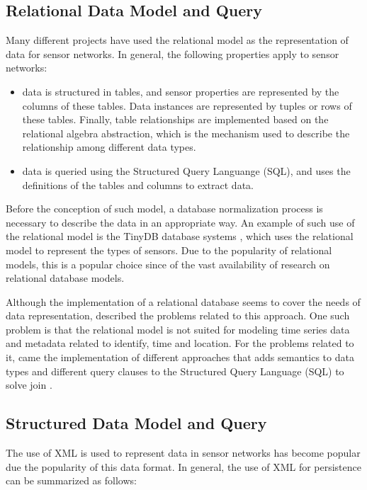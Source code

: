 \subsection{Relational Data Model and Query}

Many different projects have used the relational model \cite{relational-model}
as the representation of data for sensor networks. In general, the following
properties apply to sensor networks:

\begin{itemize}
  \item data is structured in tables, and sensor properties are represented 
 by the columns of these tables. Data instances are represented by tuples or
 rows of these tables. Finally, table relationships are implemented based
 on the relational algebra abstraction, which is the mechanism used to 
describe the relationship among different data types.
  \item data is queried using the Structured Query Languange (SQL), and uses
  the definitions of the tables and columns to extract data.
\end{itemize}

Before the conception of such model, a database normalization process is
necessary to describe the data in an appropriate way. An example of such use
of the relational model is the TinyDB database systems \cite{sn-db-tinydb},
which uses the relational model to represent the types of sensors. Due to the
popularity of relational models, this is a popular choice since of the vast
availability of research on relational database models.

Although the implementation of a relational database seems to cover the needs
of data representation, \cite{sn-data-model-survey} described the problems
related to this approach. One such problem is that the relational model is not
suited for modeling time series data and metadata related to identify, time and
location. For the problems related to it, came the implementation of different
approaches that adds semantics to data types and different query clauses to the
Structured Query Language (SQL) to solve join \cite{sn-db-newop}.

\subsection{Structured Data Model and Query}

The use of XML is used to represent data in sensor networks has become popular
due the popularity of this data format. In general, the use of XML for
persistence can be summarized as follows:

